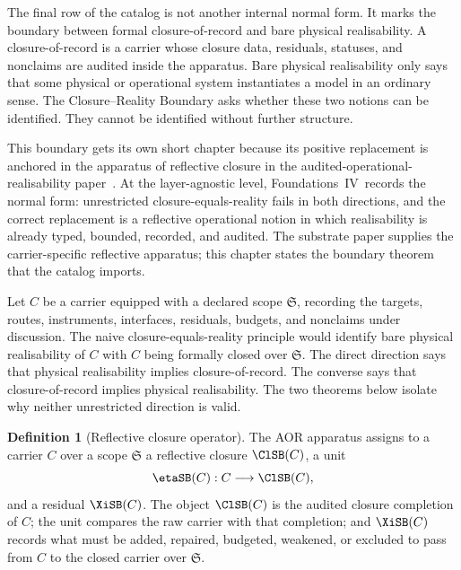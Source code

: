 \documentclass[11pt]{article}
\newcommand{\FIV}{Foundations~IV}
\newcommand{\PaperAOR}{the audited-operational-realisability paper}
\theoremstyle{definition}
\newtheorem{definition}[theorem]{Definition}
\begin{document}
The final row of the catalog is not another internal normal form.  It
marks the boundary between formal closure-of-record and bare physical
realisability.  A closure-of-record is a carrier whose closure data,
residuals, statuses, and nonclaims are audited inside the apparatus.
Bare physical realisability only says that some physical or
operational system instantiates a model in an ordinary sense.  The
Closure--Reality Boundary asks whether these two notions can be
identified.  They cannot be identified without further structure.

This boundary gets its own short chapter because its positive
replacement is anchored in the apparatus of reflective closure in
\PaperAOR\ \citep{Tsiokos2026AOR}.  At the layer-agnostic level,
\FIV\ records the normal form: unrestricted closure-equals-reality
fails in both directions, and the correct replacement is a reflective
operational notion in which realisability is already typed, bounded,
recorded, and audited.  The substrate paper supplies the
carrier-specific reflective apparatus; this chapter states the
boundary theorem that the catalog imports.

Let \(C\) be a carrier equipped with a declared scope
\(\mathfrak S\), recording the targets, routes, instruments,
interfaces, residuals, budgets, and nonclaims under discussion.  The
naive closure-equals-reality principle would identify bare physical
realisability of \(C\) with \(C\) being formally closed over
\(\mathfrak S\).  The direct direction says that physical
realisability implies closure-of-record.  The converse says that
closure-of-record implies physical realisability.  The two theorems
below isolate why neither unrestricted direction is valid.

\begin{definition}[Reflective closure operator]\label{def:reflective-closure}
The AOR apparatus assigns to a carrier \(C\) over a scope
\(\mathfrak S\) a reflective closure \(\ClSB(C)\), a unit
\[
  \etaSB(C):C\longrightarrow \ClSB(C),
\]
and a residual \(\XiSB(C)\).  The object \(\ClSB(C)\) is the audited
closure completion of \(C\); the unit compares the raw carrier with
that completion; and \(\XiSB(C)\) records what must be added,
repaired, budgeted, weakened, or excluded to pass from \(C\) to the
closed carrier over \(\mathfrak S\).
\end{definition}
\end{document}
